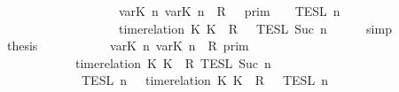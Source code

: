 \begin{isabellebody}
\ \ \ \ \ \ \ \ \ \ \ \ \ \ \ \ \ {\isacharequal}\ {\isasymlbrakk}{\isasymlbrakk}\ {\isacharparenleft}{\isasymlfloor}{\isasymtau}\isactrlsub v\isactrlsub a\isactrlsub r{\isacharparenleft}K\ n{\isacharparenright}{\isacharcomma}\ {\isasymtau}\isactrlsub v\isactrlsub a\isactrlsub r{\isacharparenleft}K\ n{\isacharparenright}{\isasymrfloor}\ {\isasymin}\ R{\isacharparenright}\ {\isacharhash}\ {\isasymGamma}\ {\isasymrbrakk}{\isasymrbrakk}\isactrlsub p\isactrlsub r\isactrlsub i\isactrlsub m\ {\isasyminter}\ {\isasymlbrakk}{\isasymlbrakk}\ {\isasymPsi}\ {\isasymrbrakk}{\isasymrbrakk}\isactrlsub T\isactrlsub E\isactrlsub S\isactrlsub L\isactrlbsup {\isasymge}\ n\isactrlesup \isanewline
\ \ \ \ \ \ \ \ \ \ \ \ \ \ \ \ \ {\isasyminter}\ {\isasymlbrakk}{\isasymlbrakk}\ {\isacharparenleft}time{\isacharminus}relation\ {\isasymlfloor}K\ K\ {\isasymin}\ R{\isacharparenright}\ {\isacharhash}\ {\isasymPhi}\ {\isasymrbrakk}{\isasymrbrakk}\isactrlsub T\isactrlsub E\isactrlsub S\isactrlsub L\isactrlbsup {\isasymge}\ Suc\ n\isactrlesup {\isacartoucheclose}\isanewline
\ \ \ \ \isamarkupfalse%
\ simp\isanewline
\ \ \isamarkupfalse%
\ \isamarkupfalse%
\ {\isacharquery}thesis\isanewline
\ \ \isamarkupfalse%
\ {\isacharminus}\isanewline
\ \ \ \ \isamarkupfalse%
\ {\isacartoucheopen}{\isasymlbrakk}\ {\isasymlfloor}{\isasymtau}\isactrlsub v\isactrlsub a\isactrlsub r{\isacharparenleft}K\ n{\isacharparenright}{\isacharcomma}\ {\isasymtau}\isactrlsub v\isactrlsub a\isactrlsub r{\isacharparenleft}K\ n{\isacharparenright}{\isasymrfloor}\ {\isasymin}\ R\ {\isasymrbrakk}\isactrlsub p\isactrlsub r\isactrlsub i\isactrlsub m\isanewline
\ \ \ \ \ \ \ \ \ \ {\isasyminter}\ {\isasymlbrakk}\ time{\isacharminus}relation\ {\isasymlfloor}K\ K\ {\isasymin}\ R\ {\isasymrbrakk}\isactrlsub T\isactrlsub E\isactrlsub S\isactrlsub L\isactrlbsup {\isasymge}\ Suc\ n\isactrlesup \isanewline
\ \ \ \ \ \ \ \ \ \ {\isasyminter}\ {\isasymlbrakk}{\isasymlbrakk}\ {\isasymPsi}\ {\isasymrbrakk}{\isasymrbrakk}\isactrlsub T\isactrlsub E\isactrlsub S\isactrlsub L\isactrlbsup {\isasymge}\ n\isactrlesup \ {\isacharequal}\ {\isasymlbrakk}{\isasymlbrakk}\ {\isacharparenleft}time{\isacharminus}relation\ {\isasymlfloor}K\ K\ {\isasymin}\ R{\isacharparenright}\ {\isacharhash}\ {\isasymPsi}\ {\isasymrbrakk}{\isasymrbrakk}\isactrlsub T\isactrlsub E\isactrlsub S\isactrlsub L\isactrlbsup {\isasymge}\ n\isactrlesup {\isacartoucheclose}\isanewline

\end{isabellebody}
